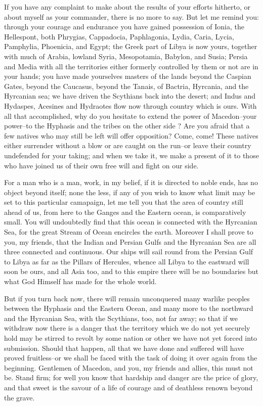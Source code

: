 \documentclass[a4paper]{amsbook}
\begin{document}
If you have any complaint to make about the results of your efforts hitherto, or about myself as your commander, there is no more to say. But let me remind you: through your courage and endurance you have gained possession of Ionia, the Hellespont, both Phrygias, Cappadocia, Paphlagonia, Lydia, Caria, Lycia, Pamphylia, Phoenicia, and Egypt; the Greek part of Libya is now yours, together with much of Arabia, lowland Syria, Mesopotamia, Babylon, and Susia; Persia and Media with all the territories either formerly controlled by them or not are in your hands; you have made yourselves masters of the lands beyond the Caspian Gates, beyond the Caucasus, beyond the Tanais, of Bactria, Hyrcania, and the Hyrcanian sea; we have driven the Scythians back into the desert; and Indus and Hydaspes, Acesines and Hydraotes flow now through country which is ours. With all that accomplished, why do you hesitate to extend the power of Macedon--your power--to the Hyphasis and the tribes on the other side ? Are you afraid that a few natives who may still be left will offer opposition? Come, come! These natives either surrender without a blow or are caught on the run--or leave their country undefended for your taking; and when we take it, we make a present of it to those who have joined us of their own free will and fight on our side.

For a man who is a man, work, in my belief, if it is directed to noble ends, has no object beyond itself; none the less, if any of you wish to know what limit may be set to this particular camapaign, let me tell you that the area of country still ahead of us, from here to the Ganges and the Eastern ocean, is comparatively small. You will undoubtedly find that this ocean is connected with the Hyrcanian Sea, for the great Stream of Ocean encircles the earth. Moreover I shall prove to you, my friends, that the Indian and Persian Gulfs and the Hyrcanian Sea are all three connected and continuous. Our ships will sail round from the Persian Gulf to Libya as far as the Pillars of Hercules, whence all Libya to the eastward will soon be ours, and all Asia too, and to this empire there will be no boundaries but what God Himself has made for the whole world.

But if you turn back now, there will remain unconquered many warlike peoples between the Hyphasis and the Eastern Ocean, and many more to the northward and the Hyrcanian Sea, with the Scythians, too, not far away; so that if we withdraw now there is a danger that the territory which we do not yet securely hold may be stirred to revolt by some nation or other we have not yet forced into submission. Should that happen, all that we have done and suffered will have proved fruitless--or we shall be faced with the task of doing it over again from the beginning. Gentlemen of Macedon, and you, my friends and allies, this must not be. Stand firm; for well you know that hardship and danger are the price of glory, and that sweet is the savour of a life of courage and of deathless renown beyond the grave.
\end{document}
